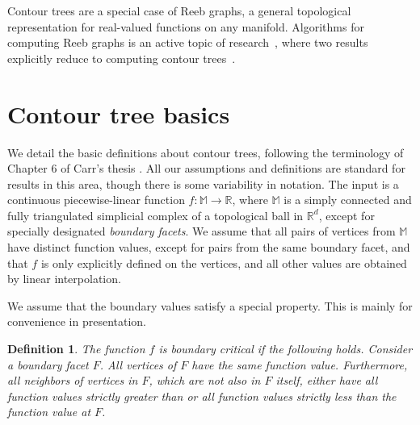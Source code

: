 \documentclass[11pt]{article}
\newtheorem{definition}[theorem]{Definition}
\theoremstyle{definition}
\newcommand{\MM}{\mathbb{M}}
\newcommand{\RR}{\mathbb{R}}
\newcommand{\Sec}[1]{\hyperref[sec:#1]{\S\ref*{sec:#1}}} %
\begin{document}
Contour trees are a special case of Reeb graphs, a general topological representation for real-valued functions
on any manifold. Algorithms for computing Reeb graphs
is an active topic of research~\cite{sk-crgacs-91,cehnp-lrbm-03,PaScBr07,DoNa09,HaWaWe10,Pa12}, where
two results explicitly reduce to computing contour trees~\cite{TiGySi09,DoNa13}.



\section{Contour tree basics} \label{sec:basics}

We detail the basic definitions about contour trees, following the terminology of Chapter 6 of Carr's thesis \cite{c-tmi-04}.
All our assumptions and definitions
are standard for results in this area, though there is some variability in notation.
The input is a continuous piecewise-linear function $f:\MM \to \RR$, where $\MM$ is a simply connected and fully triangulated simplicial complex of a topological ball in $\RR^d$,
except for specially designated \emph{boundary facets}. We assume that all pairs of vertices from $\MM$ have distinct function values, except for pairs from the same boundary facet,
and that $f$ is only explicitly defined on the vertices, and all other values are obtained by linear interpolation. 

We assume that the boundary values satisfy a special property. This is mainly for convenience
in presentation.

\begin{definition} \label{def:bound} The function $f$ is \emph{boundary critical} if the following holds.
Consider a boundary facet $F$. All vertices of $F$ have the same function value. Furthermore, all
neighbors of vertices in $F$, which are not also in $F$ itself, 
either have all function values strictly greater than or all function values strictly less than the function value at $F$.
\end{definition}
\end{document}
